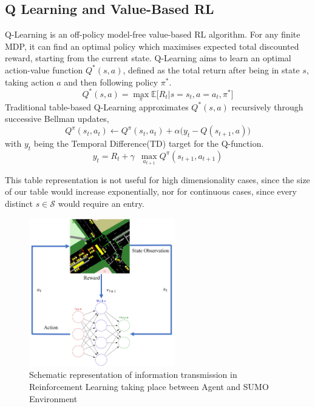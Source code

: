 \documentclass[conference]{IEEEtran}
\begin{document}
\subsection{Q Learning and Value-Based RL}
Q-Learning\cite{watkins} is an off-policy model-free value-based RL algorithm. For any finite MDP, it can find an optimal policy which maximises expected total discounted reward, starting from the current state\cite{melo}.
Q-Learning aims to learn an optimal action-value function $Q^*(s,a)$, defined as the total return after being in state $s$, taking action $a$ and then following policy $\pi^*$. %
\begin{equation}
Q^*(s,a) = \max_{\pi} \mathbb{E} \big[ R_t | s=s_t, a=a_t, \pi^* \big]
\label{eq:qlearning}
\end{equation}
Traditional table-based Q-Learning approximates $Q^*(s,a)$ recursively through successive Bellman updates,
\begin{equation}
Q^{\pi}(s_t,a_t) \leftarrow Q^{\pi}(s_t,a_t) + \alpha \big( y_t - Q(s_{t+1},a) \big)
\label{eq:bellmanupdate}
\end{equation}
with $y_t$ being the Temporal Difference(TD) target for the Q-function.
\begin{equation}
y_t = R_t + \gamma \,\,\, \max_{a_{t+1}} Q^{\pi}(s_{t+1},a_{t+1})
\end{equation}

This table representation is not useful for high dimensionality cases, since the size of our table would increase exponentially, nor for continuous cases, since every distinct $s\in\mathcal{S}$ would require an entry.

\begin{figure}                                                
\centering                                                    
\includegraphics[width=2.5in]{schematic_pp2.png}                                    
\caption{Schematic representation of information transmission in Reinforcement Learning taking place between Agent and SUMO Environment}                                  
\label{rl}                                               
\end{figure}  
\end{document}
